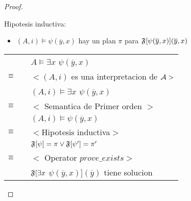 \begin{proof}
\begin{itemize}
\begin{itemize}
					  Hipotesis inductiva:
					 	\begin{itemize}
					 		\item $(A,i) \models \psi(\overline{y},x)$ hay un plan $\pi$ para $\mathfrak{F}[\psi(\overline{y},x)] (\overline{y},x)$
					 	\end{itemize}
				
					\begin{tabular}{@{}p{1mm}p{1mm}p{11cm}}	
					 	& & $A \models \exists x$ $ \psi(\overline{y},x)$\\
						$\equiv$ & & $<(A,i)$ es una interpretacion de $\mathcal{A}>$ \\
						& & $(A,i) \models \exists x$ $ \psi(\overline{y},x)$ \\
						$\equiv$ & & $<$ Semantica de Primer orden $>$\\
						& & $(A,i) \models \psi(\overline{y},x)$ \\
						$\equiv$ & & $<$Hipotesis inductiva$>$\\
						& & $\mathfrak{F}[\psi] = \pi \lor \mathfrak{F}[\psi'] = \pi'$\\
						$\equiv$ & & $<$ Operator $ prove\_exists >$\\
						& & $\mathfrak{F}[\exists x$ $ \psi(\overline{y},x)](\overline{y})$ tiene solucion
					\end{tabular}

			\end{itemize}
		
	\end{itemize}
\end{proof}
